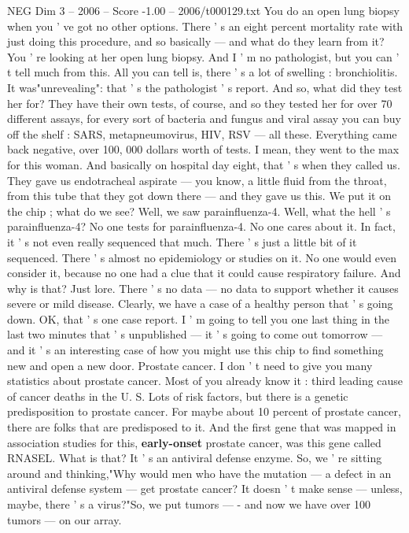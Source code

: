 \begin{textsample}{NEG Dim 3 – 2006 – Score -1.00 – 2006/t000129.txt}
You do an open lung biopsy when you ' ve got no other options.
There ' s an eight percent mortality rate with just doing this procedure, and so basically — and what do they learn from it?
You ' re looking at her open lung biopsy.
And I ' m no pathologist, but you can ' t tell much from this.
All you can tell is, there ' s a lot of swelling : bronchiolitis.
It was"unrevealing": that ' s the pathologist ' s report.
And so, what did they test her for?
They have their own tests, of course, and so they tested her for over 70 different assays, for every sort of bacteria and fungus and viral assay you can buy off the shelf : SARS, metapneumovirus, HIV, RSV — all these.
Everything came back negative, over 100, 000 dollars worth of tests.
I mean, they went to the max for this woman.
And basically on hospital day eight, that ' s when they called us.
They gave us endotracheal aspirate — you know, a little fluid from the throat, from this tube that they got down there — and they gave us this.
We put it on the chip ; what do we see?
Well, we saw parainfluenza-4.
Well, what the hell ' s parainfluenza-4?
No one tests for parainfluenza-4.
No one cares about it.
In fact, it ' s not even really sequenced that much.
There ' s just a little bit of it sequenced.
There ' s almost no epidemiology or studies on it.
No one would even consider it, because no one had a clue that it could cause respiratory failure.
And why is that?
Just lore.
There ' s no data — no data to support whether it causes severe or mild disease.
Clearly, we have a case of a healthy person that ' s going down.
OK, that ' s one case report.
I ' m going to tell you one last thing in the last two minutes that ' s unpublished — it ' s going to come out tomorrow — and it ' s an interesting case of how you might use this chip to find something new and open a new door.
Prostate cancer.
I don ' t need to give you many statistics about prostate cancer.
Most of you already know it : third leading cause of cancer deaths in the U.
S.
Lots of risk factors, but there is a genetic predisposition to prostate cancer.
For maybe about 10 percent of prostate cancer, there are folks that are predisposed to it.
And the first gene that was mapped in association studies for this, \textbf{early-onset} prostate cancer, was this gene called RNASEL.
What is that?
It ' s an antiviral defense enzyme.
So, we ' re sitting around and thinking,"Why would men who have the mutation — a defect in an antiviral defense system — get prostate cancer?
It doesn ' t make sense — unless, maybe, there ' s a virus?"So, we put tumors — - and now we have over 100 tumors — on our array.

\end{textsample}
